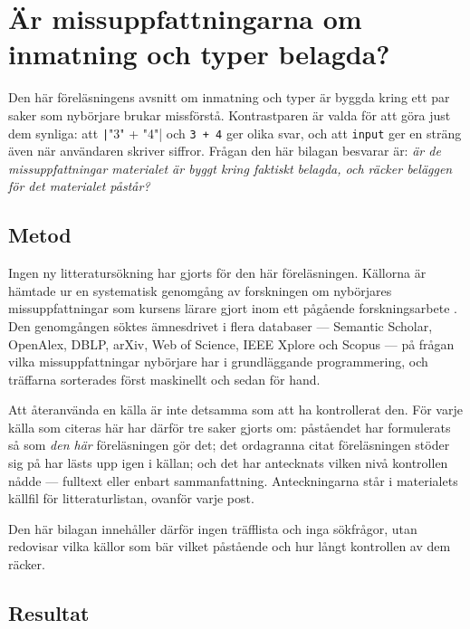 \chapter{Är missuppfattningarna om inmatning och typer belagda?}
\label{app:missuppfattningar}

Den här föreläsningens avsnitt om inmatning och typer är byggda kring
ett par saker som nybörjare brukar missförstå.  Kontrastparen är valda
för att göra just
dem synliga: att
\texttt|"3" + "4"| och \texttt{3 + 4} ger olika
svar, och att \texttt{input} ger en sträng även när
användaren skriver siffror.  Frågan den här bilagan besvarar är:
\emph{är de missuppfattningar materialet är byggt kring faktiskt
belagda, och räcker beläggen för det materialet påstår?}

\section{Metod}
\label{sec:input-metod}

Ingen ny litteratursökning har gjorts för den här föreläsningen.
Källorna är hämtade ur en systematisk genomgång av forskningen om
nybörjares missuppfattningar som kursens lärare gjort inom ett
pågående forskningsarbete \autocite{SooriBosk2026}.  Den genomgången
söktes ämnesdrivet i flera
databaser --- Semantic Scholar, OpenAlex, DBLP, arXiv, Web of Science,
IEEE Xplore och Scopus --- på frågan vilka missuppfattningar nybörjare
har i grundläggande programmering, och träffarna sorterades först
maskinellt och sedan för hand.

Att återanvända en källa är inte detsamma som att ha kontrollerat den.
För varje källa som citeras här har därför tre saker gjorts om:
påståendet har formulerats så som \emph{den här} föreläsningen gör det;
det ordagranna citat föreläsningen stöder sig på har lästs upp igen i
källan; och det har antecknats vilken nivå kontrollen nådde --- fulltext
eller enbart sammanfattning.  Anteckningarna står i materialets källfil
för litteraturlistan, ovanför varje post.

Den här bilagan innehåller därför ingen träfflista och inga sökfrågor,
utan redovisar vilka källor som bär vilket påstående och hur långt
kontrollen av dem räcker.

\section{Resultat}
\label{sec:input-resultat}

